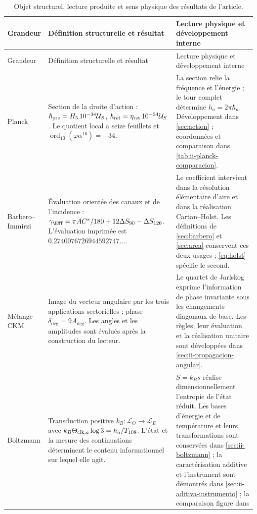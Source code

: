 \begingroup
\setlength{\LTpre}{0pt}
\setlength{\LTpost}{2pt}
\begin{longtable}{@{}p{.13\linewidth}p{.415\linewidth}p{.395\linewidth}@{}}
\caption{Objet structurel, lecture produite et sens physique des
résultats de l’article.}\label{tab:ii-conclusiones-estructura}\\
\toprule
Grandeur & Définition structurelle et résultat & Lecture physique et développement interne\\
\midrule
\endfirsthead
\toprule
Grandeur & Définition structurelle et résultat & Lecture physique et développement interne\\
\midrule
\endhead
\bottomrule
\endfoot
Planck & Section de la droite d’action :
$\hbar_{\rm pre}=H_5\,10^{-34}\mathcal U_S$,
$\hbar_{\rm ret}=\eta_{\rm ret}\,10^{-34}\mathcal U_S$.
Le quotient local a seize feuillets et
$\operatorname{ord}_{10}(\varphi\alpha^{16})=-34$.
& La section relie la fréquence et l’énergie ; le tour complet détermine
$h_a=2\pi\hbar_a$. Développement dans \ref{sec:action} ; coordonnées et comparaison
dans \ref{tab:ii-planck-comparacion}.\\[5pt]
Barbero--Immirzi & Évaluation orientée des canaux et de l’incidence :
$\gamma_{\HMT}=\pi AC^*/180+12\Delta S_{90}-\Delta S_{120}$.
L’évaluation imprimée est $0.2740076726944592747\ldots$.
& Le coefficient intervient dans la résolution élémentaire d’aire et dans
la réalisation Cartan--Holst. Les définitions de
\ref{sec:barbero} et \ref{sec:area} conservent ces deux usages ;
\eqref{eq:holst} spécifie le second.\\[5pt]
Mélange CKM & Image du vecteur angulaire par les trois applications
sectorielles ; phase $\delta_{\deg}=9A_{\deg}$.
Les angles et les amplitudes sont évalués après la construction du lecteur.
& Le quartet de Jarlskog exprime l’information de phase invariante
sous les changements diagonaux de base. Les règles, leur évaluation et la
réalisation unitaire sont développées dans
\ref{sec:ii-propagacion-angular}.\\[5pt]
Boltzmann & Transduction positive
$k_B:\mathcal L_\Theta\to\mathcal L_E$ avec
$k_B\Theta_{{\rm clk},a}\log3=h_a/T_{108}$.
L’état et la mesure des continuations déterminent le contenu
informationnel sur lequel elle agit.
& $S=k_Bs$ réalise dimensionnellement l’entropie de l’état réduit.
Les bases d’énergie et de température et leurs transformations sont conservées
dans \ref{sec:ii-boltzmann} ; la caractérisation additive et l’instrument
sont démontrés dans \ref{sec:ii-aditiva-instrumento} ; la comparaison figure dans

\end{longtable}
